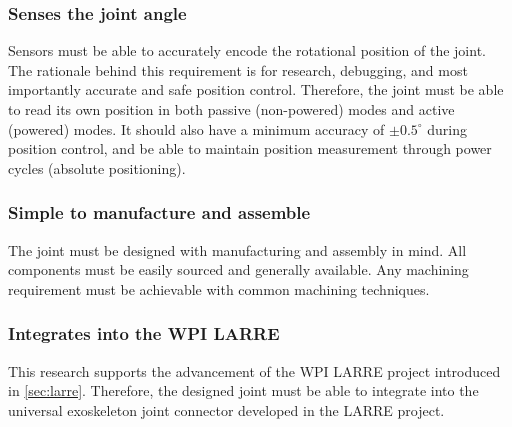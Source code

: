 \subsubsection{Senses the joint angle}
Sensors must be able to accurately encode the rotational position of the joint. The rationale behind this requirement is for research, debugging, and most importantly accurate and safe position control. Therefore, the joint must be able to read its own position in both passive (non-powered) modes and active (powered) modes. It should also have a minimum accuracy of \(\pm0.5^\circ\) during position control, and be able to maintain position measurement through power cycles (absolute positioning).

\subsubsection{Simple to manufacture and assemble}
The joint must be designed with manufacturing and assembly in mind. All components must be easily sourced and generally available. Any machining requirement must be achievable with common machining techniques.

\subsubsection{Integrates into the WPI LARRE}
This research supports the advancement of the WPI LARRE project introduced in \autoref{sec:larre}. Therefore, the designed joint must be able to integrate into the universal exoskeleton joint connector developed in the LARRE project.
